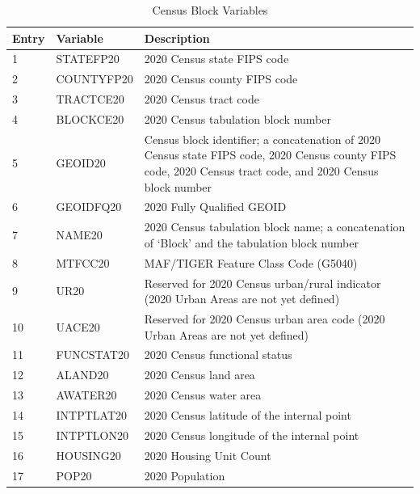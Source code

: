 \documentclass[fleqn,10pt]{wlscirep}
\begin{document}
\begin{table}[htbp]
\centering
\caption{Census Block Variables}
\label{tab:census_block}
\begin{tabular}{llp{8cm}}
\toprule
\textbf{Entry} & \textbf{Variable} & \textbf{Description} \\
\midrule
1 & STATEFP20 & 2020 Census state FIPS code \\
2 & COUNTYFP20 & 2020 Census county FIPS code \\
3 & TRACTCE20 & 2020 Census tract code \\
4 & BLOCKCE20 & 2020 Census tabulation block number \\
5 & GEOID20 & Census block identifier; a concatenation of 2020 Census state FIPS code, 2020 Census county FIPS code, 2020 Census tract code, and 2020 Census block number \\
6 & GEOIDFQ20 & 2020 Fully Qualified GEOID \\
7 & NAME20 & 2020 Census tabulation block name; a concatenation of ‘Block’ and the tabulation block number \\
8 & MTFCC20 & MAF/TIGER Feature Class Code (G5040) \\
9 & UR20 & Reserved for 2020 Census urban/rural indicator (2020 Urban Areas are not yet defined) \\
10 & UACE20 & Reserved for 2020 Census urban area code (2020 Urban Areas are not yet defined) \\
11 & FUNCSTAT20 & 2020 Census functional status \\
12 & ALAND20 & 2020 Census land area \\
13 & AWATER20 & 2020 Census water area \\
14 & INTPTLAT20 & 2020 Census latitude of the internal point \\
15 & INTPTLON20 & 2020 Census longitude of the internal point \\
16 & HOUSING20 & 2020 Housing Unit Count \\
17 & POP20 & 2020 Population \\
\bottomrule
\end{tabular}
\end{table}
\end{document}
